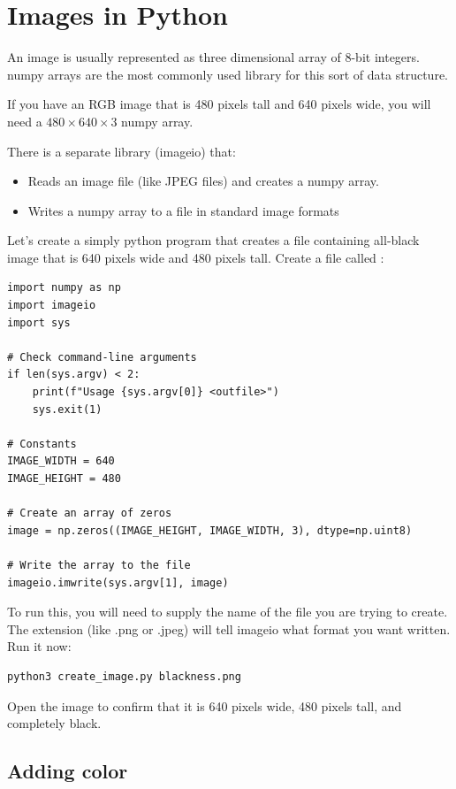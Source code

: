 \chapter{Images in Python}

An image is usually represented as three dimensional array of 8-bit
integers. numpy arrays are the most commonly used library for this
sort of data structure.

If you have an RGB image that is 480 pixels tall and 640 pixels wide,
you will need a $480 \times 640 \times 3$ numpy array.

There is a separate library (imageio) that:
\begin{itemize}
\item Reads an image file (like JPEG files) and creates a numpy array.
\item Writes a numpy array to a file in standard image formats
\end{itemize}

Let's create a simply python program that creates a file containing
all-black image that is 640 pixels wide and 480 pixels tall. Create a
file called :

\begin{Verbatim}
import numpy as np
import imageio
import sys

# Check command-line arguments
if len(sys.argv) < 2:
    print(f"Usage {sys.argv[0]} <outfile>")
    sys.exit(1)

# Constants
IMAGE_WIDTH = 640
IMAGE_HEIGHT = 480

# Create an array of zeros
image = np.zeros((IMAGE_HEIGHT, IMAGE_WIDTH, 3), dtype=np.uint8)

# Write the array to the file
imageio.imwrite(sys.argv[1], image)
\end{Verbatim}

To run this, you will need to supply the name of the file you are
trying to create. The extension (like .png or .jpeg) will tell imageio
what format you want written. Run it now:

\begin{Verbatim}
python3 create_image.py blackness.png
\end{Verbatim}

Open the image to confirm that it is 640 pixels wide, 480 pixels tall, and completely black.

\section{Adding color}

